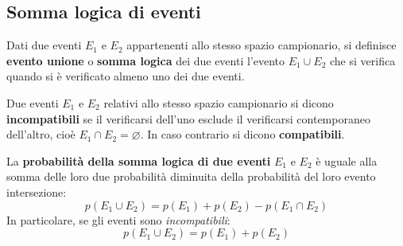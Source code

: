 \documentclass{article}     %
\begin{document}
            \subsection{Somma logica di eventi}
                \begin{boxdef}
                    Dati due eventi $E_1$ e $E_2$ appartenenti allo stesso spazio campionario, si definisce \textbf{evento unione} o \textbf{somma logica} dei due eventi l'evento $E_1 \cup E_2$ che si verifica quando si è verificato almeno uno dei due eventi. 
                \end{boxdef}
                \begin{boxdef}
                    Due eventi $E_1$ e $E_2$ relativi allo stesso spazio campionario si dicono \textbf{incompatibili} se il verificarsi dell'uno esclude il verificarsi contemporaneo dell'altro, cioè $E_1\cap E_2=\varnothing$. In caso contrario si dicono \textbf{compatibili}. 
                \end{boxdef}
                \begin{shadedTheorem}
                    La \textbf{probabilità della somma logica di due eventi} $E_1$ e $E_2$ è uguale alla somma delle loro due probabilità diminuita della probabilità del loro evento intersezione:
                    \[p(E_1\cup E_2)=p(E_1)+p(E_2)-p(E_1\cap E_2)\]
                    In particolare, se gli eventi sono \textit{incompatibili}:
                    \[p(E_1\cup E_2)=p(E_1)+p(E_2)\]
                \end{shadedTheorem}
\end{document}
